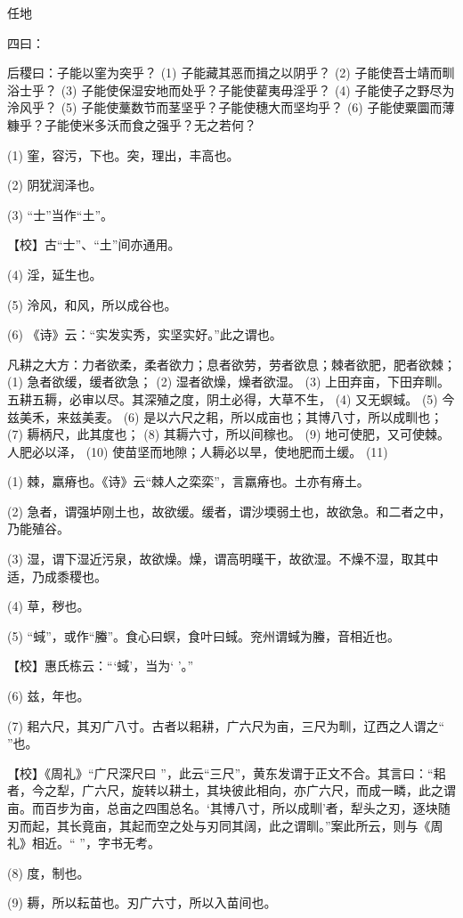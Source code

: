 \documentclass[12pt,UTF8]{ctexbook}
\begin{document}
任地


四曰：

后稷曰：子能以窐为突乎？ (1) 子能藏其恶而揖之以阴乎？ (2) 子能使吾士靖而甽浴士乎？ (3) 子能使保湿安地而处乎？子能使雚夷毋淫乎？ (4) 子能使子之野尽为泠风乎？ (5) 子能使藳数节而茎坚乎？子能使穗大而坚均乎？ (6) 子能使粟圜而薄糠乎？子能使米多沃而食之强乎？无之若何？

(1) 窐，容污，下也。突，理出，丰高也。

(2) 阴犹润泽也。

(3) “士”当作“土”。

【校】古“士”、“土”间亦通用。

(4) 淫，延生也。

(5) 泠风，和风，所以成谷也。

(6) 《诗》云：“实发实秀，实坚实好。”此之谓也。

凡耕之大方：力者欲柔，柔者欲力；息者欲劳，劳者欲息；棘者欲肥，肥者欲棘； (1) 急者欲缓，缓者欲急； (2) 湿者欲燥，燥者欲湿。 (3) 上田弃亩，下田弃甽。五耕五耨，必审以尽。其深殖之度，阴土必得，大草不生， (4) 又无螟蜮。 (5) 今兹美禾，来兹美麦。 (6) 是以六尺之耜，所以成亩也；其博八寸，所以成甽也； (7) 耨柄尺，此其度也； (8) 其耨六寸，所以间稼也。 (9) 地可使肥，又可使棘。人肥必以泽， (10) 使苗坚而地隙；人耨必以旱，使地肥而土缓。 (11)

(1) 棘，羸瘠也。《诗》云“棘人之栾栾”，言羸瘠也。土亦有瘠土。

(2) 急者，谓强垆刚土也，故欲缓。缓者，谓沙堧弱土也，故欲急。和二者之中，乃能殖谷。

(3) 湿，谓下湿近污泉，故欲燥。燥，谓高明暵干，故欲湿。不燥不湿，取其中适，乃成黍稷也。

(4) 草，秽也。

(5) “蜮”，或作“螣”。食心曰螟，食叶曰蜮。兖州谓蜮为螣，音相近也。

【校】惠氏栋云：“‘蜮’，当为‘ ’。”

(6) 兹，年也。

(7) 耜六尺，其刃广八寸。古者以耜耕，广六尺为亩，三尺为甽，辽西之人谓之“ ”也。

【校】《周礼》“广尺深尺曰 ”，此云“三尺”，黄东发谓于正文不合。其言曰：“耜者，今之犁，广六尺，旋转以耕土，其块彼此相向，亦广六尺，而成一疄，此之谓亩。而百步为亩，总亩之四围总名。‘其博八寸，所以成甽’者，犁头之刃，逐块随刃而起，其长竟亩，其起而空之处与刃同其阔，此之谓甽。”案此所云，则与《周礼》相近。“ ”，字书无考。

(8) 度，制也。

(9) 耨，所以耘苗也。刃广六寸，所以入苗间也。
\end{document}
